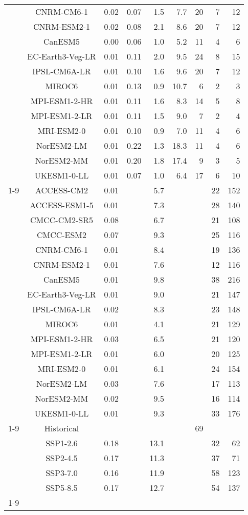 \begin{table*}[t]
\begin{tabular}{c|c|rr|rr|rrr}
 & CNRM-CM6-1 & 0.02 & 0.07 & 1.5 & 7.7 & 20 & 7 & 12 \\
 & CNRM-ESM2-1 & 0.02 & 0.08 & 2.1 & 8.6 & 20 & 7 & 12 \\
 & CanESM5 & 0.00 & 0.06 & 1.0 & 5.2 & 11 & 4 & 6 \\
 & EC-Earth3-Veg-LR & 0.01 & 0.11 & 2.0 & 9.5 & 24 & 8 & 15 \\
 & IPSL-CM6A-LR & 0.01 & 0.10 & 1.6 & 9.6 & 20 & 7 & 12 \\
 & MIROC6 & 0.01 & 0.13 & 0.9 & 10.7 & 6 & 2 & 3 \\
 & MPI-ESM1-2-HR & 0.01 & 0.11 & 1.6 & 8.3 & 14 & 5 & 8 \\
 & MPI-ESM1-2-LR & 0.01 & 0.11 & 1.5 & 9.0 & 7 & 2 & 4 \\
 & MRI-ESM2-0 & 0.01 & 0.10 & 0.9 & 7.0 & 11 & 4 & 6 \\
 & NorESM2-LM & 0.01 & 0.22 & 1.3 & 18.3 & 11 & 4 & 6 \\
 & NorESM2-MM & 0.01 & 0.20 & 1.8 & 17.4 & 9 & 3 & 5 \\
 & UKESM1-0-LL & 0.01 & 0.07 & 1.0 & 6.4 & 17 & 6 & 10 \\
\cline{1-9}
\multirow[c]{16}{*}{Scenario uncertainty} & ACCESS-CM2 & 0.01 &  & 5.7 &  &  & 22 & 152 \\
 & ACCESS-ESM1-5 & 0.01 &  & 7.3 &  &  & 28 & 140 \\
 & CMCC-CM2-SR5 & 0.08 &  & 6.7 &  &  & 21 & 108 \\
 & CMCC-ESM2 & 0.07 &  & 9.3 &  &  & 25 & 116 \\
 & CNRM-CM6-1 & 0.01 &  & 8.4 &  &  & 19 & 136 \\
 & CNRM-ESM2-1 & 0.01 &  & 7.6 &  &  & 12 & 116 \\
 & CanESM5 & 0.01 &  & 9.8 &  &  & 38 & 216 \\
 & EC-Earth3-Veg-LR & 0.01 &  & 9.0 &  &  & 21 & 147 \\
 & IPSL-CM6A-LR & 0.02 &  & 8.3 &  &  & 23 & 148 \\
 & MIROC6 & 0.01 &  & 4.1 &  &  & 21 & 129 \\
 & MPI-ESM1-2-HR & 0.03 &  & 6.5 &  &  & 21 & 120 \\
 & MPI-ESM1-2-LR & 0.01 &  & 6.0 &  &  & 20 & 125 \\
 & MRI-ESM2-0 & 0.01 &  & 6.1 &  &  & 24 & 154 \\
 & NorESM2-LM & 0.03 &  & 7.6 &  &  & 17 & 113 \\
 & NorESM2-MM & 0.02 &  & 9.5 &  &  & 16 & 114 \\
 & UKESM1-0-LL & 0.01 &  & 9.3 &  &  & 33 & 176 \\
\cline{1-9}
\multirow[c]{5}{*}{Model uncertainty} & Historical &  &  &  &  & 69 &  &  \\
 & SSP1-2.6 & 0.18 &  & 13.1 &  &  & 32 & 62 \\
 & SSP2-4.5 & 0.17 &  & 11.3 &  &  & 37 & 71 \\
 & SSP3-7.0 & 0.16 &  & 11.9 &  &  & 58 & 123 \\
 & SSP5-8.5 & 0.17 &  & 12.7 &  &  & 54 & 137 \\
\cline{1-9}
\bottomrule
\end{tabular}
\end{table*}
